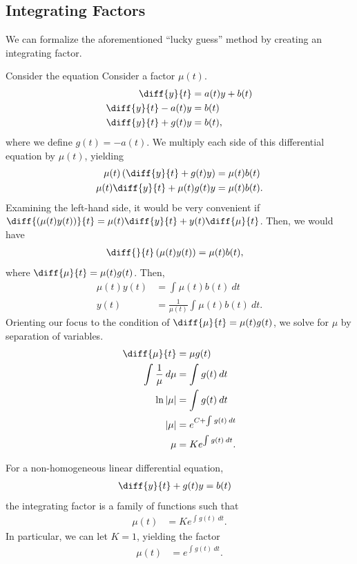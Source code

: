 \documentclass[10pt]{mypackage}
\begin{document}
\subsection{Integrating Factors}%
We can formalize the aforementioned ``lucky guess'' method by creating an integrating factor.
\begin{derivation}
  Consider the equation
  Consider a factor $\mu(t)$.
  \begin{align*}
    \diff{y}{t} &= a(t) y + b(t)\\
    \diff{y}{t} - a(t) y &= b(t)\\
    \diff{y}{t} + g(t) y &= b(t),
  \end{align*}
  where we define $g(t) = -a(t)$. We multiply each side of this differential equation by $\mu(t)$, yielding
  \begin{align*}
    \mu(t)\left(\diff{y}{t} + g(t)y\right) &= \mu(t)b(t)\\
    \mu(t)\diff{y}{t} + \mu(t)g(t)y &= \mu(t)b(t).
  \end{align*}
  Examining the left-hand side, it would be very convenient if $\diff{\left(\mu(t)y(t)\right)}{t} = \mu(t)\diff{y}{t} + y(t)\diff{\mu}{t}$. Then, we would have
  \begin{align*}
    \diff{}{t}\left(\mu(t)y(t)\right) &= \mu(t)b(t),
  \end{align*}
  where $\diff{\mu}{t} = \mu(t)g(t)$. Then,
  \begin{align*}
    \mu(t)y(t) &= \int_{}^{} \mu(t)b(t)\:dt\\
    y(t) &= \frac{1}{\mu(t)}\int_{}^{} \mu(t)b(t)\:dt.
  \end{align*}
  Orienting our focus to the condition of $\diff{\mu}{t} = \mu(t)g(t)$, we solve for $\mu$ by separation of variables.
  \begin{align*}
    \diff{\mu}{t} &= \mu g(t)\\
    \int_{}^{} \frac{1}{\mu}\:d\mu &= \int_{}^{} g(t)\:dt\\
    \ln \left\vert \mu \right\vert &= \int_{}^{} g(t)\:dt\\
    \left\vert \mu \right\vert &= e^{C + \int_{}^{} g(t)\:dt}\\
    \mu &= K e^{\int_{}^{} g(t)\:dt}.
  \end{align*}
\end{derivation}
\begin{definition}
  For a non-homogeneous linear differential equation,
  \begin{align*}
    \diff{y}{t} + g(t)y &= b(t)
  \end{align*}
  the integrating factor is a family of functions such that
  \begin{align*}
    \mu(t) &= Ke^{\int_{}^{} g(t)\:dt}.
  \end{align*}
  In particular, we can let $K = 1$, yielding the factor
  \begin{align*}
    \mu(t) &= e^{\int_{}^{} g(t)\:dt}.
  \end{align*}
\end{definition}
\end{document}
